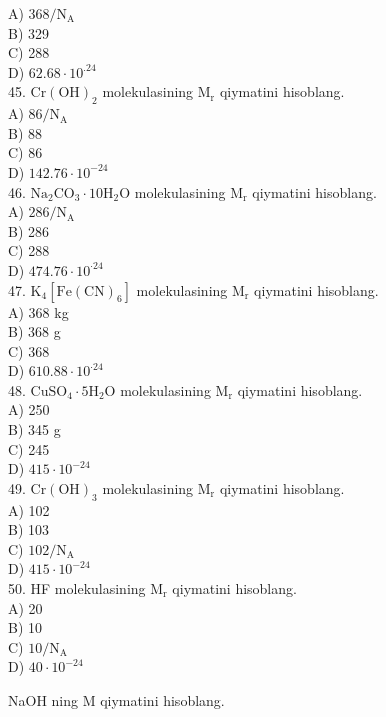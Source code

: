 A) $368 / \mathrm{N}_{\mathrm{A}}$\\
B) 329\\
C) 288\\
D) $62.68 \cdot 10^{.24}$\\
45. $\mathrm{Cr}(\mathrm{OH})_{2}$ molekulasining $\mathrm{M}_{\mathrm{r}}$ qiymatini hisoblang.\\
A) $86 / \mathrm{N}_{\mathrm{A}}$\\
B) 88\\
C) 86\\
D) $142.76 \cdot 10^{-24}$\\
46. $\mathrm{Na}_{2} \mathrm{CO}_{3} \cdot 10 \mathrm{H}_{2} \mathrm{O}$ molekulasining $\mathrm{M}_{\mathrm{r}}$ qiymatini hisoblang.\\
A) $286 / \mathrm{N}_{\mathrm{A}}$\\
B) 286\\
C) 288\\
D) $474.76 \cdot 10^{\cdot 24}$\\
47. $\mathrm{K}_{4}\left[\mathrm{Fe}(\mathrm{CN})_{6}\right]$ molekulasining $\mathrm{M}_{\mathrm{r}}$ qiymatini hisoblang.\\
A) 368 kg\\
B) 368 g\\
C) 368\\
D) $610.88 \cdot 10^{\cdot 24}$\\
48. $\mathrm{CuSO}_{4} \cdot 5 \mathrm{H}_{2} \mathrm{O}$ molekulasining $\mathrm{M}_{\mathrm{r}}$ qiymatini hisoblang.\\
A) 250\\
B) 345 g\\
C) 245\\
D) $415 \cdot 10^{-24}$\\
49. $\mathrm{Cr}(\mathrm{OH})_{3}$ molekulasining $\mathrm{M}_{\mathrm{r}}$ qiymatini hisoblang.\\
A) 102\\
B) 103\\
C) $102 / \mathrm{N}_{\mathrm{A}}$\\
D) $415 \cdot 10^{-24}$\\
50. HF molekulasining $\mathrm{M}_{\mathrm{r}}$ qiymatini hisoblang.\\
A) 20\\
B) 10\\
C) $10 / \mathrm{N}_{\mathrm{A}}$\\
D) $40 \cdot 10^{-24}$
  \item NaOH ning M qiymatini hisoblang.\\
